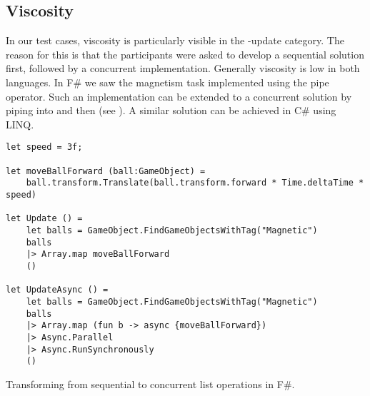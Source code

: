 \subsection{Viscosity}
In our test cases, viscosity is particularly visible in the -update category. The reason for this is that the participants were asked to develop a sequential solution first, followed by a concurrent implementation. Generally viscosity is low in both languages. In F\# we saw the magnetism task implemented using the pipe operator. Such an implementation can be extended to a concurrent solution by piping into  and then  (see ). A similar solution can be achieved in C\# using \gls{LINQ}.

\begin{listing}[H]
    \begin{verbatim}
let speed = 3f;

let moveBallForward (ball:GameObject) =
    ball.transform.Translate(ball.transform.forward * Time.deltaTime * speed)

let Update () =
    let balls = GameObject.FindGameObjectsWithTag("Magnetic")
    balls
    |> Array.map moveBallForward
    ()

let UpdateAsync () =
    let balls = GameObject.FindGameObjectsWithTag("Magnetic")
    balls
    |> Array.map (fun b -> async {moveBallForward})
    |> Async.Parallel
    |> Async.RunSynchronously
    ()
    \end{verbatim}
    \caption{Transforming from sequential to concurrent list operations in F\#.}
    \label{lst:fsharp:pipe:async}
\end{listing}

